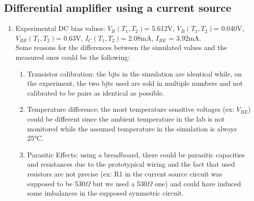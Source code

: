 \documentclass{article}
\begin{document}
	\subsection{Differential amplifier using a current source}
	\begin{enumerate}
		\item
		Experimental DC bias values: \(V_B(T_1,T_2)\)= 5.612V, \(V_B(T_1,T_2)\)= 0.040V, \(V_{BE}(T_1,T_2)\)= 0.63V, \(I_{C}(T_1,T_2)\)= 2.08mA, \(I_{RE}\) = 3.92mA.\\
		Some reasons for the differences between the simulated values and the measured ones could be the following:
		\begin{enumerate}
			\item Transistor calibration: the bjts in the simulation are identical while, on the experiment, the two bjts used are sold in multiple numbers and not calibrated to be pairs as identical as possible.
			\item Temperature difference: the most temperature sensitive voltages (ex: \(V_{BE}\)) could be different since the ambient temperature in the lab is not monitored while the assumed temperature in the simulation is always 25°C.
			\item Parasitic Effects: using a breadboard, there could be parasitic capacities and resistances due to the prototypical wiring and the fact that used resistors are not precise (ex: R1 in the current source circuit was supposed to be 530\(\Omega\) but we used a 530\(\Omega\) one) and could have induced some imbalances in the supposed symmetric circuit.  
		\end{enumerate}
		

\end{enumerate}
\end{document}
